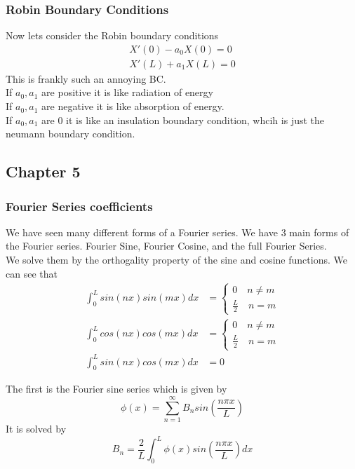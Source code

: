 \documentclass[answers,12pt,addpoints]{exam}
\begin{document}
    \subsubsection{Robin Boundary Conditions}
    Now lets consider the Robin boundary conditions 
    \begin{align*}
        X'(0) - a_0 X(0) = 0\\
        X'(L) + a_1 X(L) = 0
    \end{align*}
    This is frankly such an annoying BC.\\
    If $a_0, a_1$ are positive it is like radiation of energy\\
    If $a_0, a_1$ are negative it is like absorption of energy.\\
    If $a_0, a_1$ are 0 it is like an insulation boundary condition, whcih is just the neumann boundary condition.\\

    \subsection{Chapter 5}
    \subsubsection{Fourier Series coefficients}
    We have seen many different forms of a Fourier series. We have 3 main forms of the Fourier series. Fourier Sine, Fourier Cosine, and the full Fourier Series.\\
    We solve them by the orthogality property of the sine and cosine functions. We can see that
    \begin{align*}
        \int_{0}^{L} sin(nx) sin(mx) dx &= \begin{cases}
            0 \quad n \neq m\\
            \frac{L}{2} \quad n = m
        \end{cases}\\
        \int_{0}^{L} cos(nx) cos(mx) dx &= \begin{cases}
            0 \quad n \neq m\\
            \frac{L}{2} \quad n = m
        \end{cases}\\
        \int_{0}^{L} sin(nx) cos(mx) dx &= 0
    \end{align*}    
    
    The first is the Fourier sine series which is given by
    $$ \phi(x) = \sum_{n=1}^{\infty} B_n sin(\frac{n \pi x}{L})$$
    It is solved by 
    $$ B_n = \frac{2}{L} \int_{0}^{L} \phi(x) sin(\frac{n \pi x}{L}) dx$$
\end{document}
